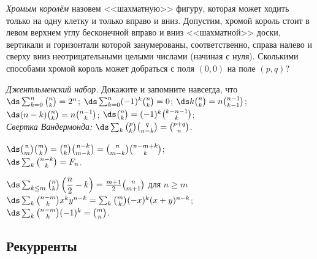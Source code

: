 \begin{problems}

\item
\emph{Хромым королём} назовем <<шахматную>> фигуру, которая может ходить только
на одну клетку и только вправо и вниз.
Допустим, хромой король стоит в левом верхнем углу бесконечной вправо и вниз
<<шахматной>> доски, вертикали и горизонтали которой занумерованы,
соответственно, справа налево и сверху вниз неотрицательными целыми числами
(начиная с нуля).
Сколькими способами хромой король может добраться с поля $(0, 0)$ на поле
$(p, q)$?

\item\emph{Джентльменский набор.}
Докажите и запомните навсегда, что
\\[1ex]
\sbp
\(\ds
    \sum_{k = 0}^n
        \binom{n}{k}
=
    2^n
\);
\qquad
\sbp
\(\ds
    \sum_{k = 0}^n
        (-1)^{k} \binom{n}{k}
=
    0
\);
\qquad
\sbp
\(\ds
    k \binom{n}{k}
=
    n \binom{n-1}{k-1}
\);
\\[0.5ex]
\sbp
\(\ds
    (n - k) \binom{n}{k}
=
    n \binom{n-1}{k}
\);
\qquad
\sbp
\(\ds
    \binom{n}{k}
=
    (-1)^k \binom{k - n - 1}{k}
\);
\\[1ex]
\sbp\emph{Свертка Вандермонда:}
\;
\(\ds
    \sum_{k}
        \binom{p}{k}
        \binom{q}{n - k}
=
    \binom{p + q}{n}
\).

\item
\sbp
\(\ds
    \binom{n}{m} \binom{m}{k}
=
    \binom{n}{k} \binom{n - k}{m - k}
=
    \binom{n}{m - k}
    \binom{n - m + k}{k}
\);
\\[1ex]
\sbp
\(\ds
    \sum_{k}
        \binom{n - k}{k}
=
    F_n
\).

\item
\sbp
\(\ds
    \sum_{k \leq m}
        \binom{n}{k}
        \left(
            \dfrac{n}{2} - k
        \right)
=
    \frac{m + 1}{2}
    \binom{n}{m + 1}
\)
для $n\geq m$
\\[0.5ex]
\sbp
\(\ds
    \sum_{k}
    \binom{n - m}{k}
    x^k y^{n - k}
=
    \sum_{k}
        \binom{m}{k}
        (-x)^k (x + y)^{n - k}
\);
\\[0.5ex]
\sbp
\(\ds
    \sum_{k}
        \binom{n - m}{k}
        (-1)^k
=
    \binom{m}{n}
\).

\end{problems}

\subsection*{Рекурренты}

